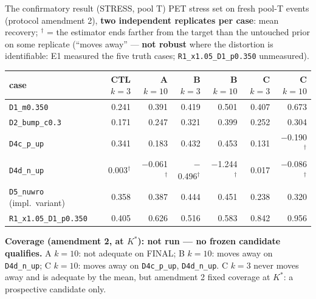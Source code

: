 \documentclass[aspectratio=169,10pt]{beamer}
\def\evidencetext{}
\begin{document}
\gdef\evidencetext{\texttt{confirm/results/confirm\_results.json}}
\begin{frame}{The confirmatory result (STRESS, pool T)}
{\small PET stress set on fresh pool-T events (protocol amendment 2), \textbf{two independent replicates per
case}: mean recovery; $^\dagger$ = the estimator ends farther from the target than the untouched prior on some
replicate (``moves away'' --- \textbf{not robust} where the distortion is identifiable: E1 measured the five truth
cases; \texttt{R1\_x1.05\_D1\_p0.350} unmeasured).}
\begin{center}
{\scriptsize
\begin{tabular}{lrrrrrr}
\toprule
case & CTL $k=3$ & A $k=10$ & B $k=3$ & B $k=10$ & C $k=3$ & C $k=10$ \\
\midrule
\texttt{D1\_m0.350} & 0.241 & 0.391 & 0.419 & 0.501 & 0.407 & 0.673 \\
\texttt{D2\_bump\_c0.3} & 0.171 & 0.247 & 0.321 & 0.399 & 0.252 & 0.304 \\
\texttt{D4c\_p\_up} & 0.341 & 0.183 & 0.432 & 0.453 & 0.131 & \ensuremath{-}0.190$^\dagger$ \\
\texttt{D4d\_n\_up} & 0.003$^\dagger$ & \ensuremath{-}0.061$^\dagger$ & \ensuremath{-}0.496$^\dagger$ & \ensuremath{-}1.244$^\dagger$ & 0.017 & \ensuremath{-}0.086$^\dagger$ \\
\texttt{D5\_nuwro}\,(impl.\ variant) & 0.358 & 0.387 & 0.444 & 0.451 & 0.238 & 0.320 \\
\texttt{R1\_x1.05\_D1\_p0.350} & 0.405 & 0.626 & 0.516 & 0.583 & 0.842 & 0.956 \\
\bottomrule
\end{tabular}}
\end{center}
{\footnotesize \textbf{Coverage (amendment 2, at $K^*$): not run --- no frozen candidate qualifies.} A $k=10$: not adequate on FINAL; B $k=10$: moves away on \texttt{D4d\_n\_up}; C $k=10$: moves away on \texttt{D4c\_p\_up}, \texttt{D4d\_n\_up}. C $k=3$ never moves away and is adequate by the mean, but amendment 2 fixed coverage at $K^*$: a prospective candidate only.}
\end{frame}
\end{document}
